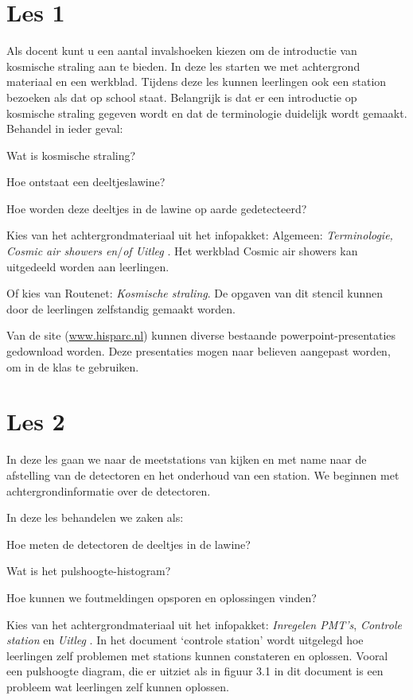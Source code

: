 \section{Les 1}

Als docent kunt u een aantal invalshoeken kiezen om de introductie van
kosmische straling aan te bieden.  In deze les starten we met
achtergrond materiaal en een werkblad. Tijdens deze les kunnen
leerlingen ook een station bezoeken als dat op school staat. Belangrijk
is dat er een introductie op kosmische straling gegeven wordt en dat de
terminologie duidelijk wordt gemaakt.
Behandel in ieder geval:
\begin{description}
    \item{Wat is kosmische straling?}
    \item{Hoe ontstaat een deeltjeslawine?}
    \item{Hoe worden deze deeltjes in de lawine op aarde gedetecteerd?}
\end{description}
Kies van het achtergrondmateriaal uit het infopakket:
Algemeen:  \textit{Terminologie, Cosmic air showers en$/$of Uitleg \hisparc}.
Het werkblad Cosmic air showers kan uitgedeeld worden aan leerlingen.

Of kies van Routenet: 
\textit{Kosmische straling}. De opgaven van dit stencil kunnen door de leerlingen zelfstandig gemaakt worden.

Van de \hisparc site (\url{www.hisparc.nl}) kunnen diverse bestaande powerpoint-presentaties gedownload worden.
Deze presentaties mogen naar believen aangepast worden, om in de klas te gebruiken.

\section{Les 2}
In deze les gaan we naar de meetstations van \hisparc kijken en met name naar de 
afstelling van de detectoren en het onderhoud van een station.
We beginnen met achtergrondinformatie over de detectoren.

In deze les behandelen we zaken als:
\begin{description}
    \item{Hoe meten de detectoren de deeltjes in de lawine?}
    \item{Wat is het pulshoogte-histogram?}
    \item{Hoe kunnen we foutmeldingen opsporen en oplossingen vinden?}
\end{description}

Kies van het achtergrondmateriaal uit het infopakket: \textit{Inregelen
PMT's}, \textit{Controle station} en \textit{Uitleg \hisparc}. In het
document `controle station' wordt uitgelegd hoe leerlingen zelf
problemen met stations kunnen constateren en oplossen. Vooral een
pulshoogte diagram, die er uitziet als in figuur 3.1 in dit document is
een probleem wat leerlingen zelf kunnen oplossen.

